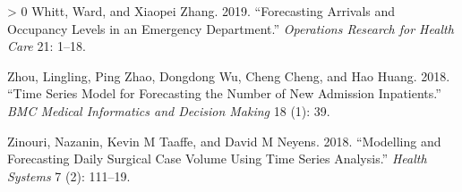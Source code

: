 \documentclass[]{elsarticle} %
\newlength{\cslhangindent}
\newenvironment{CSLReferences}[3] %
 {%
  \setlength{\parindent}{0pt}
  \ifodd #1 \everypar{\setlength{\hangindent}{\cslhangindent}}\ignorespaces\fi
  \ifnum #2 > 0
  \setlength{\parskip}{#3\baselineskip}
  \fi
 }%
 {}
\begin{document}
\begin{CSLReferences}{1}{0}
\leavevmode\hypertarget{ref-whitt2019forecasting}{}%
Whitt, Ward, and Xiaopei Zhang. 2019. {``Forecasting Arrivals and Occupancy Levels in an Emergency Department.''} \emph{Operations Research for Health Care} 21: 1--18.

\leavevmode\hypertarget{ref-zhou2018time}{}%
Zhou, Lingling, Ping Zhao, Dongdong Wu, Cheng Cheng, and Hao Huang. 2018. {``Time Series Model for Forecasting the Number of New Admission Inpatients.''} \emph{BMC Medical Informatics and Decision Making} 18 (1): 39.

\leavevmode\hypertarget{ref-zinouri2018modelling}{}%
Zinouri, Nazanin, Kevin M Taaffe, and David M Neyens. 2018. {``Modelling and Forecasting Daily Surgical Case Volume Using Time Series Analysis.''} \emph{Health Systems} 7 (2): 111--19.

\end{CSLReferences}
\end{document}
